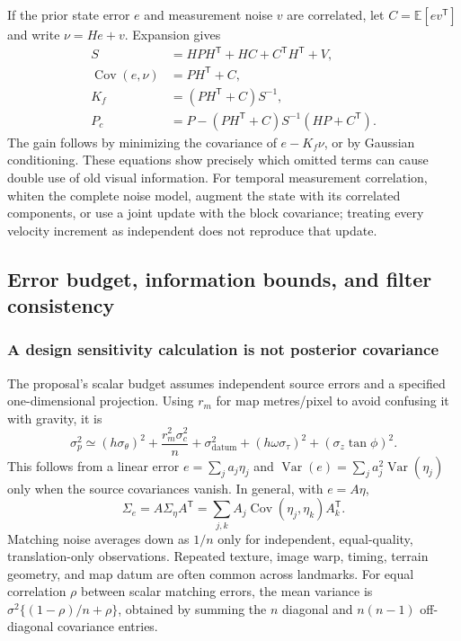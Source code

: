 If the prior state error $e$ and measurement noise $v$ are correlated,
let $C=\mathbb E[e v^{\mathsf T}]$ and write $\nu=He+v$. Expansion gives
\begin{align}
 S&=HPH^{\mathsf T}+HC+C^{\mathsf T}H^{\mathsf T}+V,\\
 \operatorname{Cov}(e,\nu)&=PH^{\mathsf T}+C,\\
 K_f&=(PH^{\mathsf T}+C)S^{-1},\\
 P_c&=P-(PH^{\mathsf T}+C)S^{-1}(HP+C^{\mathsf T}).
 \label{eq:correlated-measurement-update}
\end{align}
The gain follows by minimizing the covariance of $e-K_f\nu$, or by
Gaussian conditioning. These equations show precisely which omitted
terms can cause double use of old visual information. For temporal
measurement correlation, whiten the complete noise model, augment the
state with its correlated components, or use a joint update with the
block covariance; treating every velocity increment as independent
does not reproduce that update.

\subsection{Error budget, information bounds, and filter consistency}

\subsubsection{A design sensitivity calculation is not posterior covariance}

The proposal's scalar budget assumes independent source errors and a
specified one-dimensional projection. Using $r_m$ for map metres/pixel
to avoid confusing it with gravity, it is
\begin{equation}
 \sigma_p^2\simeq(h\sigma_\theta)^2+
       \frac{r_m^2\sigma_c^2}{n}+\sigma_{\mathrm{datum}}^2+
       (h\omega\sigma_\tau)^2+(\sigma_z\tan\phi)^2.
 \label{eq:scalar-budget}
\end{equation}
This follows from a linear error $e=\sum_j a_j\eta_j$ and
$\operatorname{Var}(e)=\sum_j a_j^2\operatorname{Var}(\eta_j)$ only when
the source covariances vanish. In general, with $e=A\eta$,
\begin{equation}
 \Sigma_e=A\Sigma_\eta A^{\mathsf T}
          =\sum_{j,k}A_j\operatorname{Cov}(\eta_j,\eta_k)A_k^{\mathsf T}.
\end{equation}
Matching noise averages down as $1/n$ only for independent, equal-quality,
translation-only observations. Repeated texture, image warp, timing,
terrain geometry, and map datum are often common across landmarks.
For equal correlation $\rho$ between scalar matching errors, the mean
variance is $\sigma^2\{(1-\rho)/n+\rho\}$, obtained by summing the
$n$ diagonal and $n(n-1)$ off-diagonal covariance entries.

